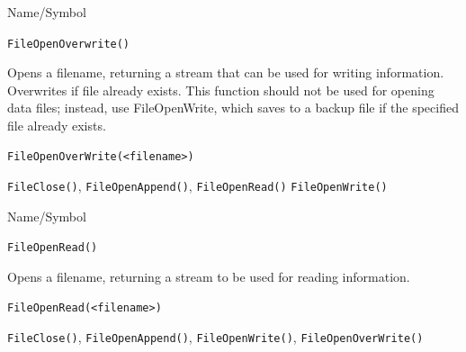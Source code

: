 \begin{desc}{Name/Symbol}
\item[Name/Symbol]	\verb+FileOpenOverwrite()+

\item[Description] Opens a filename, returning a stream that can be
  used for writing information.  Overwrites if file already exists.
  This function should not be used for opening data files; instead,
  use FileOpenWrite, which saves to a backup file if the specified
  file already exists.

\item[Usage]
\begin{verbatim}
FileOpenOverWrite(<filename>)
\end{verbatim}

\item[Example]	

\item[See Also]	\verb+FileClose()+, \verb+FileOpenAppend()+,
\verb+FileOpenRead()+  \verb+FileOpenWrite()+

\end{desc}


\begin{desc}{Name/Symbol}
\item[Name/Symbol]	\verb+FileOpenRead()+

\item[Description]  	Opens a filename, returning  a stream to be used 
		for reading information.

\item[Usage]
\begin{verbatim}
FileOpenRead(<filename>)
\end{verbatim}

\item[Example]	

\item[See Also]	\verb+FileClose()+, \verb+FileOpenAppend()+, \verb+FileOpenWrite()+, \verb+FileOpenOverWrite()+
\end{desc}


